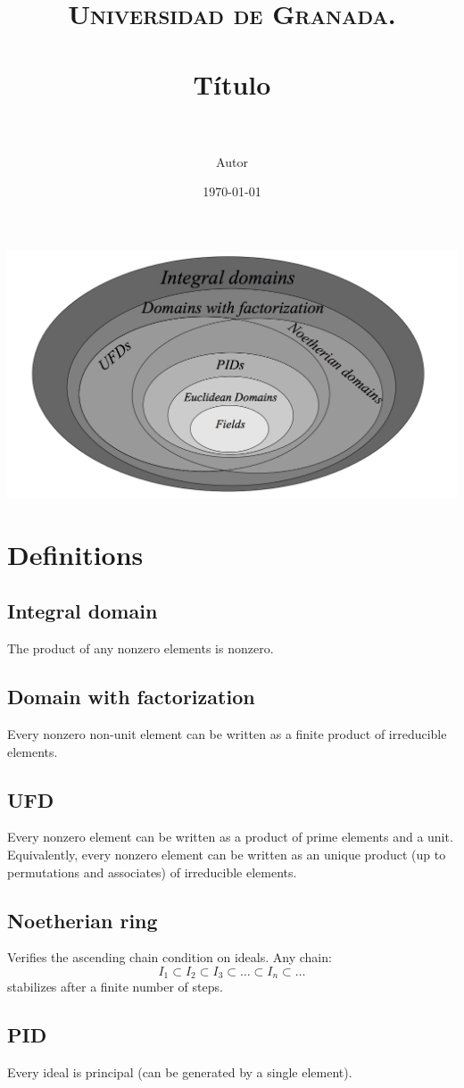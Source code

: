 \documentclass[paper=a4, fontsize=10pt, spanish]{scrartcl}
\title{
  \normalfont \normalsize 
  \textsc{Universidad de Granada.} \\ [25pt] %
  \horrule{0.5pt} \\[0.4cm] %
  \huge Título \\ %
  \horrule{2pt} \\[0.5cm] %
}
\author{Autor} %
\date{\normalsize\today} %
\numberwithin{equation}{section} %
\numberwithin{figure}{section} %
\numberwithin{table}{section} %
\begin{document}
 \includegraphics[width=\textwidth]{rings-aluffi.png}

 \section*{Definitions}
   \subsection*{Integral domain}
     The product of any nonzero elements is nonzero.
   \subsection*{Domain with factorization}
     Every nonzero non-unit element can be written as a finite product of irreducible elements.
   \subsection*{UFD}
     Every nonzero element can be written as a product of prime elements and a unit. Equivalently,
     every nonzero element can be written as an unique product (up to permutations and associates) of
     irreducible elements.
   \subsection*{Noetherian ring}
     Verifies the ascending chain condition on ideals. Any chain:
      \[ I_1 \subset I_2 \subset I_3 \subset \dots \subset I_n \subset \dots \]
     stabilizes after a finite number of steps.
   \subsection*{PID}
     Every ideal is principal (can be generated by a single element).
\end{document}
